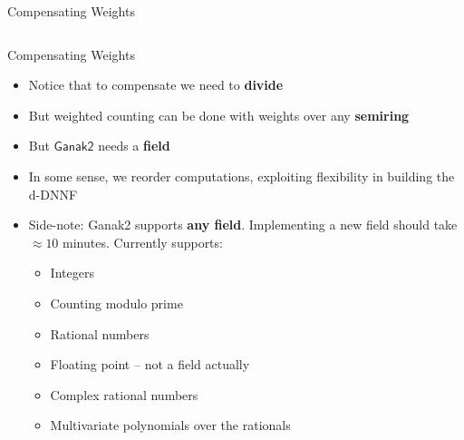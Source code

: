 \documentclass[aspectratio=169]{beamer}
\newcommand{\toolname}{\ensuremath{\mathsf{Ganak2}}}
\def\checkmark{\tikz\fill[scale=0.2](0,.35) -- (.25,0) -- (1,.7) -- (.25,.15) -- cycle;}
\begin{document}
\begin{frame}{Compensating Weights}
\begin{columns}
\begin{column}{0.55\textwidth}
\begin{center}
{ }
\end{center}
\end{column}
\end{columns}
\end{frame}

\begin{frame}{Compensating Weights}
\begin{itemize}
  \item Notice that to compensate we need to \textbf{divide}
  \item But weighted counting can be done with weights over any \textbf{semiring}
  \item But \toolname{} needs a \textbf{field}
  \item In some sense, we reorder computations, exploiting flexibility
    in building the d-DNNF
  \item Side-note: Ganak2 supports \textbf{any field}. Implementing a new
    field should take $\approx10$ minutes. Currently supports:
    \begin{itemize}
      \item Integers
      \item Counting modulo prime
      \item Rational numbers
      \item Floating point -- not a field actually
      \item Complex rational numbers
      \item Multivariate polynomials over the rationals
  \end{itemize}
\end{itemize}
\end{frame}
\end{document}
